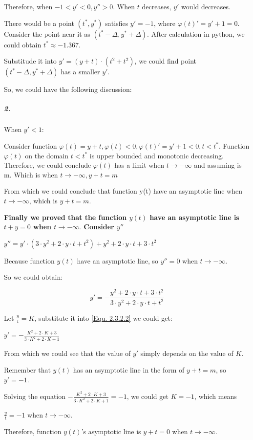 \documentclass[11pt,a4paper]{article}
\begin{document}
\begin{multicols}{2}
	Therefore, when $-1<y'<0, y'' > 0$. When $t$ decreases, $y'$ would decreases. 
	
	There would be a point $(t^*, y^*)$ satisfies $y'=-1$, where $\varphi(t)'=y'+1=0$. Consider the point near it as $(t^*-\Delta, y^*+\Delta)$. After calculation in python, we could obtain $t^* \approx -1.367$.
	
	Substitude it into $y'=(y+t)\cdot(t^2+t^2)$, we could find point $(t^*-\Delta, y^*+\Delta)$ has a smaller $y'$.
	
	So, we could have the following discussion:
	
	\subparagraph{2.} When $y' < 1$:
	
	Consider function $\varphi(t)=y+t, \varphi(t)<0, \varphi(t)'=y'+1<0, t<t^*$.
	Function $\varphi(t)$ on the domain $t<t^*$ is upper bounded and monotonic decreasing. Therefore, we could conclude $\varphi(t)$ has a limit when $t \rightarrow -\infty$ and assuming is m.
	Which is when $t \rightarrow -\infty, y+t=m$
	
	From which we could conclude that function y(t) have an asymptotic line when $t\rightarrow -\infty$, which is $y+t=m$.
	
	\textbf{Finally we proved that the function $y(t)$ have an asymptotic line is $t+y=0$ when $t\rightarrow -\infty.$ Consider $y''$}
	
	\begin{center}
		$y''=y'\cdot(3\cdot y^2+2\cdot y \cdot t+t^2)+y^2+2\cdot y \cdot t + 3\cdot t^2$
	\end{center}
	
	Because function $y(t)$ have an asymptotic line, so $y''=0$ when $t\rightarrow -\infty$.
	
	So we could obtain:
	
	\begin{equation}
		y' = -\frac{y^2+2\cdot y \cdot t + 3\cdot t^2}{3\cdot y^2+2\cdot y \cdot t + t^2} \tag{Equ 2.3.2.2} \label{Equ. 2.3.2.2}
	\end{equation}

	Let $\frac{y}{t}=K$, substitute it into \ref{Equ. 2.3.2.2} we could get:
	
	\begin{center}
		$y' = -\frac{K^2+2\cdot K+3}{3\cdot K^2+ 2\cdot K +1}$
	\end{center}
	
	From which we could see that the value of $y'$ simply depends on the value of $K$.
	
	Remember that $y(t)$ has an asymptotic line in the form of $y+t=m$, so $y'=-1$.
	
	Solving the equation $-\frac{K^2+2\cdot K+3}{3\cdot K^2+ 2\cdot K +1}=-1$, we could get $K=-1$, which means 
	
	\begin{center}
		$\frac{y}{t}=-1$ when $t\rightarrow -\infty$.
	\end{center}

	Therefore, function $y(t)$'s asymptotic line is $y+t=0$ when $t \rightarrow -\infty$.
	
\end{multicols}
\end{document}
